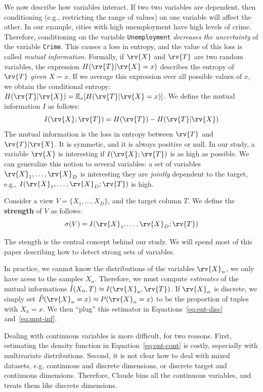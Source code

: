 We now describe how variables interact. If two two variables are dependent,
then conditioning (e.g., restricting the range of values) on one variable will
affect the other. In our example, cities with high unemployment have high
levels of crime.  Therefore, conditioning on the variable \texttt{Unemployment}
\emph{decreases the uncertainty} of the variable \texttt{Crime}. This causes a
loss in entropy, and the value of this loss is called \emph{mutual
information}.  Formally, if $\rv{X}$ and $\rv{T}$ are two random variables, the
expression $H(\rv{T} | \rv{X} = x)$ describes the entropy of $\rv{T}$
\emph{given $X = x$}. If we average this expression over all possible values of
$x$, we obtain the conditional entropy: $H(\rv{T}|\rv{X}) = \mathbb{E}_{x}
[H(\rv{T} | \rv{X} = x)]$. We define the mutual information $I$ as follows:
\begin{equation}\label{eq:mut-inf}
    I(\rv{X}; \rv{T}) = H(\rv{T}) - H(\rv{T} | \rv{X})
\end{equation}
The mutual information is the loss in entropy between $\rv{T}$ and
$\rv{T} | \rv{X}$. It is symmetic, and it is always positive or null. In our
study, a variable $\rv{X}$ is interesting if $I(\rv{X}; \rv{T})$ is as high as
possible.  We can generalize this notion to several variables: a set of
variables $\rv{X}_1, \ldots, \rv{X}_D$ is interesting they are \emph{jointly}
dependent to the target, e.g., $I(\rv{X}_1, \ldots, \rv{X}_D ; \rv{T})$ is
high.
\begin{definition}
Consider a view $V = \{X_1, \ldots, X_D\}$, and the target column $T$. We
define the \textbf{strength} of $V$ as follows: 
\begin{equation}\label{eq:strength}
    \sigma(V) = I(\rv{X}_1, \ldots, \rv{X}_D ; \rv{T})
\end{equation}
\end{definition} 
The stength is the central concept behind our study. We will spend most of this
paper describing how to detect strong sets of variables.

In practice, we cannot know the distributions of the variables $\rv{X}_n$, we
only have acess to the samples $X_n$. Therefore, we must compute \emph{estimates}
of the mutual informations $\hat{I}(X_n, T) \approx I(\rv{X}_n, \rv{T})$.  If
$\rv{X}_n$ is discrete, we simply set $\hat{P}(\rv{X}_n = x) \approx P(\rv{X}_n =
x)$ to be the proportion of tuples with $X_n=x$. We then ``plug'' this
estimator in Equations~\ref{eq:ent-disc} and~\ref{eq:mut-inf}.

Dealing with continuous variables is more difficult, for two reasons. First,
estimating the density function in Equation~\ref{eq:ent-cont} is costly,
especially with multivariate distributions.  Second, it is not clear how to
deal with mixed datasets, e.g. continuous and discrete dimensions, or discrete
target and continuous dimensions.  Therefore, Claude bins all the continuous
variables, and treats them like discrete dimensions.

